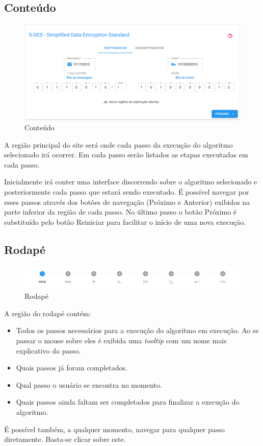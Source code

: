 \subsection{Conteúdo}

\begin{figure}[H]
    \centering
    \caption{Conteúdo}
    \includegraphics[width=1\linewidth]{UI/UIMain.png}
\end{figure}

A região principal do site será onde cada passo da execução do algoritmo selecionado irá ocorrer. Em cada passo serão listados as etapas executadas em cada passo.

Inicialmente irá conter uma interface discorrendo sobre o algoritmo selecionado e posteriormente cada passo que estará sendo executado. É possível navegar por esses passos através dos botões de navegação (Próximo e Anterior) exibidos na parte inferior da região de cada passo. No último passo o botão Próximo é substituído pelo botão Reiniciar para facilitar o início de uma nova execução.

\subsection{Rodapé}

\begin{figure}[H]
    \centering
    \caption{Rodapé}
    \includegraphics[width=1\linewidth]{UI/UIFooter.png}
\end{figure}

A região do rodapé contém:
\begin{itemize}
    \item Todos os passos necessários para a execução do algoritmo em execução. Ao se passar o mouse sobre eles é exibida uma \textit{tooltip} com um nome mais explicativo do passo.
    \item Quais passos já foram completados.
    \item Qual passo o usuário se encontra no momento.
    \item Quais passos ainda faltam ser completados para finalizar a execução do algoritmo.
\end{itemize}
É possível também, a qualquer momento, navegar para qualquer passo diretamente. Basta-se clicar sobre este.

